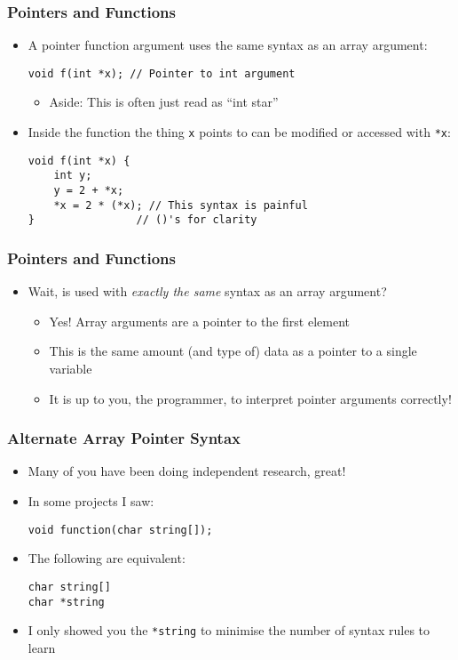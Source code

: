\documentclass[14pt]{beamer}
\begin{document}
\begin{frame}[fragile]
\frametitle{Pointers and Functions}
\begin{itemize}
\item A pointer function argument uses the same syntax as an array argument:
\begin{lstlisting}[style=CStyle]
void f(int *x); // Pointer to int argument
\end{lstlisting}
	\begin{itemize}
		\item Aside: This is often just read as ``int star''	
	\end{itemize}
\item Inside the function the thing \texttt{x} points to can be modified or accessed with \texttt{*x}:
\begin{lstlisting}[style=CStyle]
void f(int *x) {
	int y;
	y =	2 + *x;
	*x = 2 * (*x); // This syntax is painful
}                // ()'s for clarity

\end{lstlisting}
\end{itemize}
\end{frame}

\begin{frame}
\frametitle{Pointers and Functions}
\begin{itemize}
\item Wait, is used with \textit{exactly the same} syntax as an array argument?
\pause
	\begin{itemize}
		\item Yes! Array arguments are a pointer to the first element
		\item This is the same amount (and type of) data as a pointer to a single variable
		\item It is up to you, the programmer, to interpret pointer arguments correctly!
	\end{itemize}
\end{itemize}
\end{frame}

\begin{frame}[fragile]
\frametitle{Alternate Array Pointer Syntax}
\begin{itemize}
\item Many of you have been doing independent research, great!
\item In some projects I saw:
\begin{lstlisting}[style=CStyle]
void function(char string[]);
\end{lstlisting}
\item The following are equivalent:
\begin{lstlisting}[style=CStyle]
char string[]
char *string
\end{lstlisting}
\item I only showed you the \texttt{*string} to minimise the number of syntax rules to learn
\end{itemize}
\end{frame}
\end{document}
